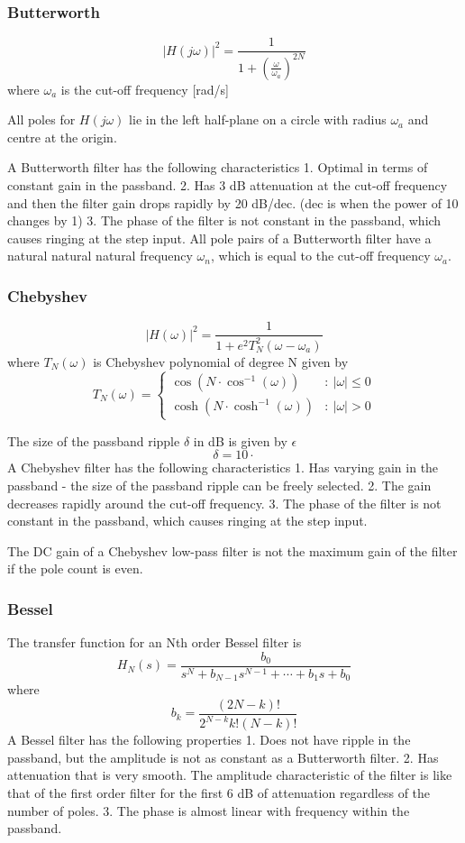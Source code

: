 \subsubsection{Butterworth}
$$|H(j\omega)|^2=\frac{1}{1+(\frac{\omega}{\omega_{a}})^{2N}}$$
where $\omega_{a}$ is the cut-off frequency [rad/s]

All poles for $H(j\omega)$ lie in the left half-plane on a circle with radius $\omega_{a}$ and centre at the origin.

A Butterworth filter has the following characteristics
1. Optimal in terms of constant gain in the passband.
2. Has 3 dB attenuation at the cut-off frequency and then the filter gain drops rapidly by 20 dB/dec. (dec is when the power of 10 changes by 1)
3. The phase of the filter is not constant in the passband, which causes ringing at the step input.
All pole pairs of a Butterworth filter have a natural natural natural frequency $\omega_{n}$, which is equal to the cut-off frequency $\omega_a$.
\subsubsection{Chebyshev}
$$|H(\omega)|^2=\frac{1}{1+e^{ 2 }T_{N}^2(\omega-\omega_{a})}$$
where $T_{N}(\omega)$ is Chebyshev polynomial of degree N given by
$$T_{N}(\omega)=\left\{ \begin{array}{cl}
\cos(N\cdot \cos^{-1}(\omega)) & : \ |\omega| \leq 0 \\
\cosh(N\cdot \cosh^{-1}(\omega)) & : \ |\omega| > 0
\end{array} \right.$$

The size of the passband ripple $\delta$ in dB is given by $\epsilon$
$$\delta=10\cdot $$
A Chebyshev filter has the following characteristics 
1. Has varying gain in the passband - the size of the passband ripple can be freely selected. 
2. The gain decreases rapidly around the cut-off frequency. 
3. The phase of the filter is not constant in the passband, which causes ringing at the step input.

The DC gain of a Chebyshev low-pass filter is not the maximum gain of the filter if the pole count is even.

\subsubsection{Bessel}
The transfer function for an Nth order Bessel filter is
$$H_{N}(s)=\frac{b_{0}}{s^N+b_{N-1} s^{N-1}+\cdots +b_{1}s+b_{0}} $$
where
$$b_{k}=\frac{(2N-k)!}{2^{N-k}k!(N-k)!}$$
A Bessel filter has the following properties
1. Does not have ripple in the passband, but the amplitude is not as constant as a Butterworth filter. 
2. Has attenuation that is very smooth. The amplitude characteristic of the filter is like that of the first order filter for the first 6 dB of attenuation regardless of the number of poles. 
3. The phase is almost linear with frequency within the passband.

